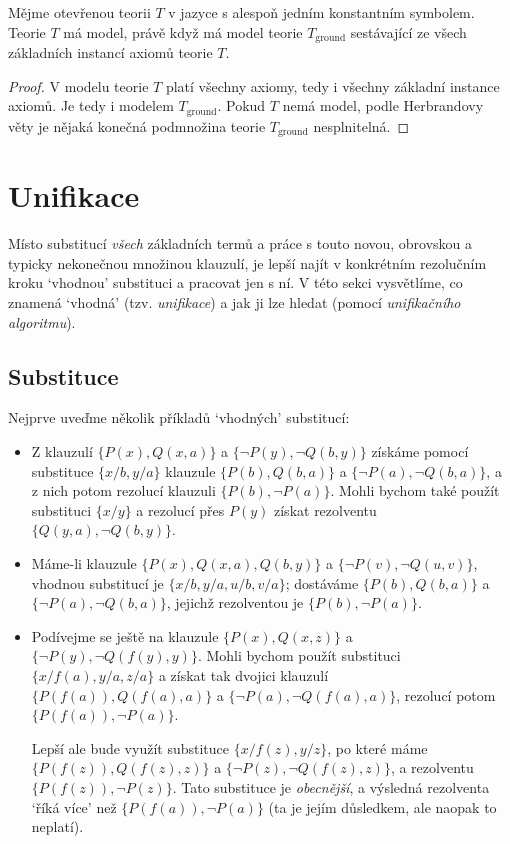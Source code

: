 \begin{corollary}\label{corollary:herbrands-theorem-corollary-ground}
    Mějme otevřenou teorii $T$ v jazyce s alespoň jedním konstantním symbolem. Teorie $T$ má model, právě když má model teorie $T_\text{ground}$ sestávající ze všech základních instancí axiomů teorie $T$.
\end{corollary}
\begin{proof}
V modelu teorie $T$ platí všechny axiomy, tedy i všechny základní instance axiomů. Je tedy i modelem $T_\text{ground}$. Pokud $T$ nemá model, podle Herbrandovy věty je nějaká konečná podmnožina teorie $T_\text{ground}$ nesplnitelná.
\end{proof}


\section{Unifikace}\label{section:unification}

Místo substitucí \emph{všech} základních termů a práce s touto novou, obrovskou a typicky nekonečnou množinou klauzulí, je lepší najít v konkrétním rezolučním kroku `vhodnou' substituci a pracovat jen s ní. V této sekci vysvětlíme, co znamená `vhodná' (tzv. \emph{unifikace}) a jak ji lze hledat (pomocí \emph{unifikačního 
algoritmu}).

\subsection{Substituce}

Nejprve uveďme několik příkladů `vhodných' substitucí:

\begin{example}\label{example:substitutions}
\begin{itemize}
    \item Z klauzulí $\{P(x),Q(x,a)\}$ a $\{\neg P(y),\neg Q(b,y)\}$ získáme pomocí substituce $\{x/b,y/a\}$ klauzule $\{P(b),Q(b,a)\}$ a $\{\neg P(a),\neg Q(b,a)\}$, a z nich potom rezolucí klauzuli $\{P(b),\neg P(a)\}$. Mohli bychom také použít substituci $\{x/y\}$ a rezolucí přes $P(y)$ získat rezolventu $\{Q(y,a),\neg Q(b,y)\}$.
    \item Máme-li klauzule $\{P(x),Q(x,a),Q(b,y)\}$ a $\{\neg P(v),\neg Q(u,v)\}$, vhodnou substitucí je $\{x/b,y/a,u/b,v/a\}$; dostáváme $\{P(b),Q(b,a)\}$ a $\{\neg P(a),\neg Q(b,a)\}$, jejichž rezolventou je $\{P(b),\neg P(a)\}$.
    \item Podívejme se ještě na klauzule $\{P(x),Q(x,z)\}$ a $\{\neg P(y),\neg Q(f(y),y)\}$. Mohli bychom použít substituci $\{x/f(a),y/a,z/a\}$ a získat tak dvojici klauzulí $\{P(f(a)),Q(f(a),a)\}$ a $\{\neg P(a),\neg Q(f(a),a)\}$, rezolucí potom $\{P(f(a)),\neg P(a)\}$.
    
    Lepší ale bude využít substituce $\{x/f(z),y/z\}$, po které máme $\{P(f(z)),Q(f(z),z)\}$ a $\{\neg P(z),\neg Q(f(z),z)\}$, a rezolventu $\{P(f(z)),\neg P(z)\}$. Tato substituce je \emph{obecnější}, a výsledná rezolventa `říká více' než $\{P(f(a)),\neg P(a)\}$ (ta je jejím důsledkem, ale naopak to neplatí).
\end{itemize}
\end{example}

